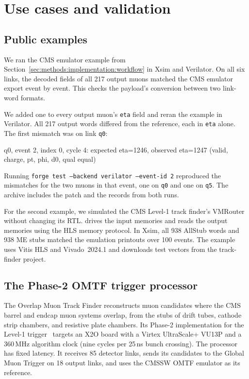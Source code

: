 \section{Use cases and validation}
\label{sec:forge:use-cases}

\subsection{Public examples}
\label{sec:forge:use-cases:golden-path}

We ran the CMS emulator example from Section~\ref{sec:methods:implementation:workflow} in Xsim and Verilator. On all six links, the decoded fields of all 217 output muons matched the CMS emulator export event by event. This checks the payload's conversion between two link-word formats.

We added one to every output muon's \texttt{eta} field and reran the example in Verilator. All 217 output words differed from the reference, each in \texttt{eta} alone. The first mismatch was on link \texttt{q0}:

\begin{codeblock}
q0, event 2, index 0, cycle 4: expected eta=1246, observed eta=1247 (valid, charge, pt, phi, d0, qual equal)
\end{codeblock}

\noindent Running \texttt{forge test --backend verilator --event-id 2} reproduced the mismatches for the two muons in that event, one on \texttt{q0} and one on \texttt{q5}. The archive includes the patch and the records from both runs.

For the second example, we simulated the CMS Level-1 track finder's VMRouter~\cite{L1TK_firmware_hls} without changing its RTL. \forge{} drives the input memories and reads the output memories using the HLS memory protocol. In Xsim, all 938 AllStub words and 938 ME stubs matched the emulation printouts over 100 events. The example uses Vitis HLS and Vivado~2024.1 and downloads test vectors from the track-finder project.

\subsection{The Phase-2 OMTF trigger processor}
\label{sec:forge:use-cases:omtf}

The Overlap Muon Track Finder reconstructs muon candidates where the CMS barrel and endcap muon systems overlap, from the stubs of drift tubes, cathode strip chambers, and resistive plate chambers. Its Phase-2 implementation for the Level-1 trigger~\cite{CMS_2020_L1TriggerUpgrade_TDR} targets an X2O board with a Virtex UltraScale+ VU13P and a 360\,MHz algorithm clock (nine cycles per 25\,ns bunch crossing). The processor has fixed latency. It receives 85 detector links, sends its candidates to the Global Muon Trigger on 18 output links, and uses the CMSSW OMTF emulator as its reference.

